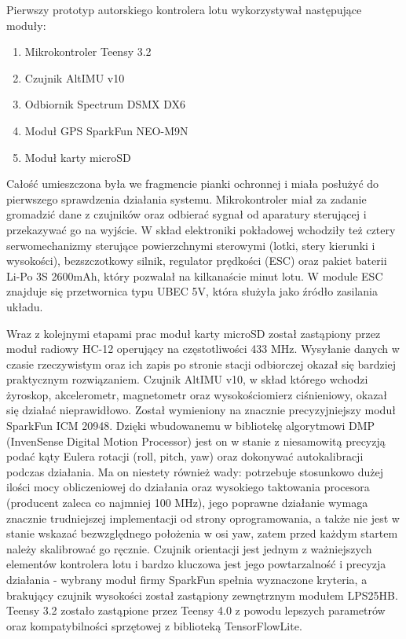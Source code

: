 \documentclass[12pt, a4paper]{article}
\begin{document}
Pierwszy prototyp autorskiego kontrolera lotu wykorzystywał następujące moduły:
\begin{enumerate}
\item Mikrokontroler Teensy 3.2
\item Czujnik AltIMU v10
\item Odbiornik Spectrum DSMX DX6
\item Moduł GPS SparkFun NEO-M9N
\item Moduł karty microSD
\end{enumerate}

Całość umieszczona była we fragmencie pianki ochronnej i miała posłużyć do pierwszego sprawdzenia działania systemu. Mikrokontroler miał za zadanie gromadzić dane z czujników oraz odbierać sygnał od aparatury sterującej i przekazywać go na wyjście. W skład elektroniki pokładowej wchodziły też cztery serwomechanizmy sterujące powierzchnymi sterowymi (lotki, stery kierunki i wysokości), bezszczotkowy silnik, regulator prędkości (ESC) oraz pakiet baterii Li-Po 3S 2600mAh, który pozwalał na kilkanaście minut lotu. W module ESC znajduje się przetwornica typu UBEC 5V, która służyła jako źródło zasilania układu.
 
Wraz z kolejnymi etapami prac moduł karty microSD został zastąpiony przez moduł radiowy HC-12 operujący na częstotliwości 433 MHz. Wysyłanie danych w czasie rzeczywistym oraz ich zapis po stronie stacji odbiorczej okazał się bardziej praktycznym rozwiązaniem. Czujnik AltIMU v10, w skład którego wchodzi żyroskop, akcelerometr, magnetometr oraz wysokościomierz ciśnieniowy, okazał się działać nieprawidłowo. Został wymieniony na znacznie precyzyjniejszy moduł SparkFun ICM 20948. Dzięki wbudowanemu w bibliotekę algorytmowi DMP (InvenSense Digital Motion Processor) jest on w stanie z niesamowitą precyzją podać kąty Eulera rotacji (roll, pitch, yaw) oraz dokonywać autokalibracji podczas działania. Ma on niestety również wady: potrzebuje stosunkowo dużej ilości mocy obliczeniowej do działania oraz wysokiego taktowania procesora (producent zaleca co najmniej 100 MHz), jego poprawne działanie wymaga znacznie trudniejszej implementacji od strony oprogramowania, a także nie jest w stanie wskazać bezwzględnego położenia w osi yaw, zatem przed każdym startem należy skalibrować go ręcznie. Czujnik orientacji jest jednym z ważniejszych elementów kontrolera lotu i bardzo kluczowa jest jego powtarzalność i precyzja działania - wybrany moduł firmy SparkFun spełnia wyznaczone kryteria, a brakujący czujnik wysokości został zastąpiony zewnętrznym modułem LPS25HB. Teensy 3.2 zostało zastąpione przez Teensy 4.0 z powodu lepszych parametrów oraz kompatybilności sprzętowej z biblioteką TensorFlowLite.
\end{document}
